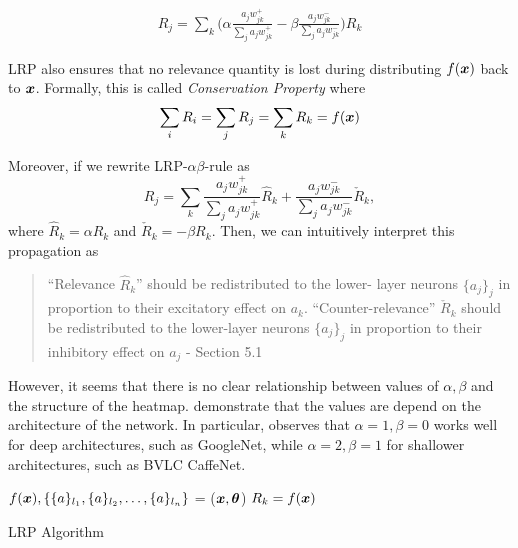 \begin{align}
	R_j = \sum_{k} 	\bigg( \alpha\frac{a_j w_{jk}^+}{\sum_{j} a_jw_{jk}^+} - \beta\frac{a_j w_{jk}^-}{\sum_{j} a_jw_{jk}^-} \bigg )  R_{k}
\end{align}


LRP also ensures that no relevance quantity is lost during distributing $f(\patvector{x})$ back to $\boldsymbol{x}$. Formally, this is called \textit{Conservation Property} where 
\begin{align*}
	\sum_{i} R_i = 	\sum_{j} R_j = 	\sum_{k} R_k = f(\patvector{x})
\end{align*}

Moreover, if we rewrite  LRP-$\alpha\beta$-rule as 
$$
	R_j = \sum_{k}  \frac{a_j w_{jk}^+}{\sum_{j} a_jw_{jk}^+} \hat{R}_{k} + \frac{a_j w_{jk}^-}{\sum_{j} a_jw_{jk}^-} \check{R}_{k},
$$ 
where $\hat{R}_{k}  = \alpha R_{k}$ and  $\check{R}_{k} = -\beta R_{k} $. Then, we can intuitively interpret this propagation as 

\begin{quote}
``Relevance $\hat{R}_k$'' should be redistributed to the lower-
layer neurons $\{a_j\}_j$ in proportion to their excitatory effect on $a_k$. ``Counter-relevance'' $\check{R}_k $ should be redistributed to the lower-layer neurons $\{a_j\}_j$ in proportion to their inhibitory effect on $a_j$
	- Section 5.1 \cite{MontavonMethodsInterpretingUnderstanding2017}
\end{quote} 

However, it seems that there is no clear relationship between values of $\alpha,\beta$ and the structure of the heatmap. \cite{MontavonMethodsInterpretingUnderstanding2017, BinderLayerwiseRelevancePropagation2016} demonstrate that the values are depend on the architecture of the network. In particular, \cite{MontavonMethodsInterpretingUnderstanding2017} observes that $\alpha=1, \beta=0$ works well for deep architectures, such as GoogleNet\cite{SzegedyGoingDeeperConvolutions2014}, while  $\alpha=2, \beta=1$ for shallower architectures, such as BVLC CaffeNet\cite{JiaCaffeConvolutionalArchitecture2014}.



\begin{algorithm}[H]
$f(\patvector{x}), \{ \{a\}_{l_1}, \{a\}_{l_2}, \dots, \{a\}_{l_n}\}$ = ($\patvector{x}, \patvector{\theta}$)\;
$R_k = f(\patvector{x})$\;
 \caption{LRP Algorithm}
 \label{algo:lrp}
\end{algorithm}

